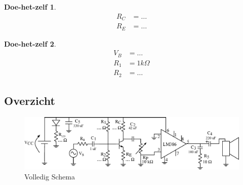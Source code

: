 \documentclass{article}
\newtheorem{DIY}{Doe-het-zelf}
\begin{document}
			\begin{DIY} 	
			~\vspace*{20ex}
				\begin{align}
				    R_C &= \ldots \\
				    R_E &= \ldots
				\end{align}
			\end{DIY}	

			\begin{DIY} 
			~\vspace*{20ex}
				\begin{align}
					V_B &= \ldots \\
				    R_1 &= 1k\Omega \\
				    R_2 &= \ldots
				\end{align}
			\end{DIY}	


\begin{landscape}
	
\section{Overzicht}
		\begin{figure}[htbp]
			\includegraphics[width=\linewidth]{volledig_schema}
			\caption{Volledig Schema}
			\label{fig:volledig_schema}
		\end{figure}
\end{landscape}
\end{document}
